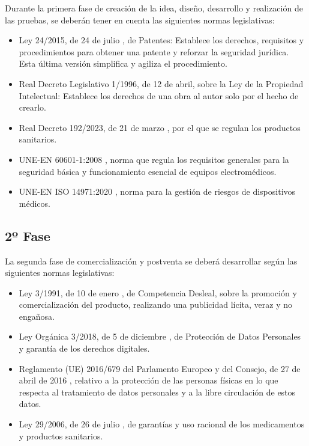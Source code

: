 Durante la primera fase de creación de la idea, diseño, desarrollo y realización de las pruebas, se deberán tener en cuenta las siguientes normas legislativas: 

\begin{itemize}
    \item Ley 24/2015, de 24 de julio \cite{boe--2015-8328}, de Patentes: Establece los derechos, requisitos y procedimientos para obtener una patente y reforzar la seguridad jurídica. Esta última versión simplifica y agiliza el procedimiento.
    \item Real Decreto Legislativo 1/1996, de 12 de abril,\cite{boe--1996-8930} sobre la Ley de la Propiedad Intelectual: Establece los derechos de una obra al autor solo por el hecho de crearlo. 
    \item Real Decreto 192/2023, de 21 de marzo \cite{ministerio_de_sanidad_real_2023}, por el que se regulan los productos sanitarios. 
    \item UNE-EN 60601-1:2008 \cite{UNE2008}, norma que regula los requisitos generales para la seguridad básica y funcionamiento esencial de equipos electromédicos.
    \item UNE-EN ISO 14971:2020 \cite{UNE2020}, norma para la gestión de riesgos de dispositivos médicos.
\end{itemize}


\subsection{2º Fase}
La segunda fase de comercialización y postventa se deberá desarrollar según las siguientes normas legislativas: 
\begin{itemize}
    \item Ley 3/1991, de 10 de enero \cite{boe--1991-628}, de Competencia Desleal, sobre la promoción y comercialización del producto, realizando una publicidad lícita, veraz y no engañosa.
    \item Ley Orgánica 3/2018, de 5 de diciembre \cite{boe--2018-16673}, de Protección de Datos Personales y garantía de los derechos digitales.
    \item Reglamento (UE) 2016/679 del Parlamento Europeo y del Consejo, de 27 de abril de 2016 \cite{boees}, relativo a la protección de las personas físicas en lo que respecta al tratamiento de datos personales y a la libre circulación de estos datos.
    \item Ley 29/2006, de 26 de julio \cite{boe--2006-13554}, de garantías y uso racional de los medicamentos y productos sanitarios.
\end{itemize}